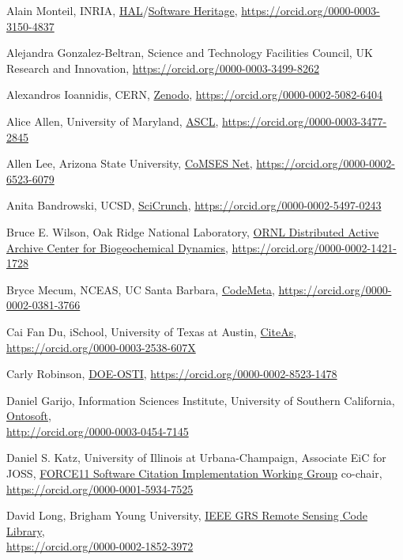 \documentclass[11pt]{article}
\begin{document}
\begin{spacing}{0.86}

Alain Monteil, INRIA, \href{https://hal.archives-ouvertes.fr/}{HAL}/\href{https://www.softwareheritage.org/}{Software Heritage},
\url{https://orcid.org/0000-0003-3150-4837}

Alejandra Gonzalez-Beltran, Science and Technology Facilities Council,
UK Research and Innovation,
\url{https://orcid.org/0000-0003-3499-8262}

Alexandros Ioannidis, CERN, \href{https://zenodo.org/}{Zenodo},
\url{https://orcid.org/0000-0002-5082-6404}

Alice Allen, University of Maryland, \href{http://ascl.net/}{ASCL},
\url{https://orcid.org/0000-0003-3477-2845}

Allen Lee, Arizona State University, \href{https://www.comses.net/}{CoMSES Net},
\url{https://orcid.org/0000-0002-6523-6079}

Anita Bandrowski, UCSD, \href{https://scicrunch.org/}{SciCrunch},
\url{https://orcid.org/0000-0002-5497-0243}

Bruce E. Wilson, Oak Ridge National Laboratory, \href{https://daac.ornl.gov/}{ORNL Distributed Active Archive Center for Biogeochemical Dynamics},
\url{https://orcid.org/0000-0002-1421-1728}

Bryce Mecum, NCEAS, UC Santa Barbara, \href{https://codemeta.github.io/}{CodeMeta},
\url{https://orcid.org/0000-0002-0381-3766}

Cai Fan Du, iSchool, University of Texas at Austin, \href{http://citeas.org/}{CiteAs},
\url{https://orcid.org/0000-0003-2538-607X}

Carly Robinson, \href{https://www.osti.gov/}{DOE-OSTI},
\url{https://orcid.org/0000-0002-8523-1478}

Daniel Garijo, Information Sciences Institute, University of Southern
California, \href{http://www.ontosoft.org/}{Ontosoft},\\
\url{http://orcid.org/0000-0003-0454-7145}

Daniel S. Katz, University of Illinois at Urbana-Champaign, Associate
EiC for JOSS, \href{https://www.force11.org/group/software-citation-implementation-working-group}{FORCE11 Software Citation Implementation Working Group}
co-chair,
\url{https://orcid.org/0000-0001-5934-7525}

David Long, Brigham Young University, \href{https://rscl-grss.org/}{IEEE GRS Remote Sensing Code Library},\\
\url{https://orcid.org/0000-0002-1852-3972}


\end{spacing}
\end{document}
